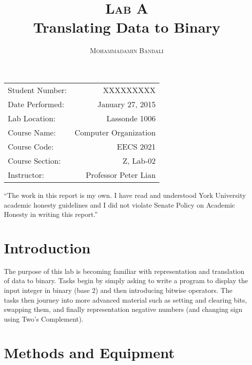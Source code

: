 \documentclass{article}
\title{\textsc{Lab A} \\ Translating Data to Binary } %
\author{\textsc{Mohammadamin Bandali}} %
\date{} %
\newenvironment{statement}{\par\vspace{50ex}}{\clearpage}
\begin{document}
\maketitle %

\begin{center}
\begin{tabular}{l r}
Student Number: & XXXXXXXXX \\ 
Date Performed: & January 27, 2015 \\ %
Lab Location: & Lassonde 1006 \\ 
Course Name: & Computer Organization \\ 
Course Code: & EECS 2021 \\ 
Course Section: & Z, Lab-02\\ 
Instructor: & Professor Peter Lian %
\end{tabular}
\end{center}

\begin{statement}
“The work in this report is my own. I have read and understood York University
academic honesty guidelines and I did not violate Senate Policy on Academic
Honesty in writing this report.”
\end{statement}


\section{Introduction}

The purpose of this lab is becoming familiar with representation and translation of data to binary. Tasks begin by simply asking to write a program to display the input integer in binary (base 2) and then introducing bitwise operators. The tasks then journey into more advanced material such as setting and clearing bits, swapping them, and finally representation negative numbers (and changing sign using Two's Complement).



\section{Methods and Equipment}
\end{document}
